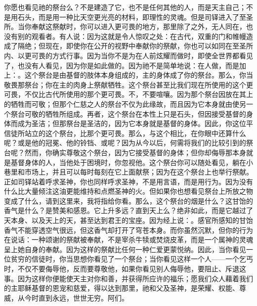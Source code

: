 你愿也看见祂的祭台么？不是建造了它，也不是任何其他的人，而是天主自己；不是用石头，而是用一种比天空更光亮的材料，即理性的灵魂。但是司铎进入了至圣所。当你奉献这祭献时，你可以进入更可畏的地方，那里除了之外，无人同在，也没有别的观看者。有人说：因为这就是令人惊叹之处：在古代，双重的门和帷幔造成了隔绝；但现在，即使你在公开的视野中奉献你的祭献，你也可以如同在至圣所内、以更可畏的方式行事。因为当你不是为在人前炫耀而做时，即使全世界都看见了，也没有人看见，因为你是如此做的。因为祂不是简单地说：在人做，而是加上：。这个祭台是由基督的肢体本身组成的，主的身体成了你的祭台。那么，你当敬畏那祭台；你在主的肉身上祭献牺牲。这个祭台甚至比我们现在所使用的这个更可畏，不仅比古代所使用的那个更可畏。不，不要喧嚷。因为那个祭台因放在其上的牺牲而可敬；但那个仁慈之人的祭台不仅为此缘故，而且因为它本身就由使另一个祭台可敬的牺牲所组成。再者，这个祭台在本性上只是石头，但因接受基督的身体而成为圣洁；但那祭台是圣洁的，因为它本身就是基督的身体。因此，你这位平信徒所站立的这个祭台，比那个更可畏。那么，与这个相比，在你眼中还算什么呢？或是他的冠冕、他的铃铛、或呢？因为从今以后，何需将我们的比较引到的祭台呢？然而，你确实尊敬这个祭台，因为它接受基督的身体；但你却侮辱那本身就是基督身体的人，当他处于困境时，你忽视他。这个祭台你可以随处看见，躺在小巷里和市场上，并且可以每时每刻在它上面献祭；因为在这个祭台上也举行祭献。正如司铎站着呼求圣神，你也同样呼求圣神，不是用言语，而是用行为。因为没有什么比大量倾注这油更能维持和点燃圣神的火。但如果你也想看见祭台上所放之物变成了什么，请到这里来，我将指给你看。那么，这个祭台的烟是什么？这甘饴的香气是什么？是赞美和感恩。它上升多远？直到天上么？绝非如此，而是它越过了天本身、以及天上的天，甚至达到君王的宝座。因为经上说：。感官所感知的甘饴香气不能穿透空气很远，但这香气却打开了穹苍本身。而你虽然沉默，但你的行为在说话：一种颂谢的祭献被奉献，不是宰杀牛犊或焚烧皮革，而是一个属神的灵魂呈上她自身的奉献。因为这样的祭献比任何一种仁爱更蒙悦纳。因此，当你看见一位贫穷的信徒时，你当思想你看见了一个祭台；当你看见这样一个人——一个乞丐时，不仅不要侮辱他，反而要尊敬他，如果你看见别人侮辱他，要阻止、斥退这事。因为这样你便能使天主对你和善，并获得所应许的福乐；愿我们众人藉着我们的主耶稣基督的恩宠和慈爱，得以达到那里，祂和父及圣神，是荣耀、权能、尊威，从今时直到永远，世世无穷。阿们。\par


